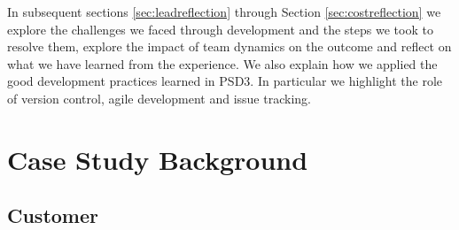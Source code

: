 \documentclass{l3proj}
\begin{document}
In subsequent sections \ref{sec:leadreflection} through Section \ref{sec:costreflection} we explore the challenges we faced through development and the steps we took to resolve them, explore the impact of team dynamics on the outcome and reflect on what we have learned from the experience. We also explain how we applied the good development practices learned in PSD3. In particular we highlight the role of version control, agile development and issue tracking.

\newpage


\section{Case Study Background}
\label{sec:background}





\subsection{Customer}
\label{sec:customer}
\end{document}
